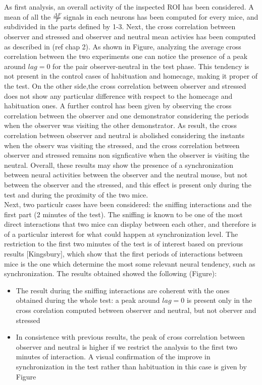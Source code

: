 \documentclass[a4paper]{article}
\begin{document}
As first analysis, an overall activity of the inspected ROI has been considered. A mean of all the $\frac{\Delta F}{F}$ signals in each neurons has been computed for every mice, and subdivided in the parts defined by 1-3. Next, the cross correlation between observer and stressed and observer and neutral mean activies has been computed as described in (ref chap 2). As shown in Figure, analyzing the average cross correlation between the two experiments one can notice the presence of a peak around $ lag=0 $ for the pair observer-neutral in the test phase. This tendency is not present in the control cases of habituation and homecage, making it proper of the test. On the other side,the cross correlation between observer and stressed does not show any particular difference with respect to the homecage and habituation ones. A further control has been given by observing the cross correlation between the observer and one demonstrator considering the periods when the observer was visiting the other demonstrator. As result, the cross correlation between observer and neutral is abolished considering the instants when the observ was visiting the stressed, and the cross correlation between observer and stressed remains non signficative when the observer is visiting the neutral. Overall, these results may show the presence of a synchronization between neural activities between the observer and the neutral mouse, but not between the observer and the stressed, and this effect is present only during the test and during the proximity of the two mice.\\
Next, two particulr cases have been considered: the sniffing interactions and the first part (2 minutes of the test). The sniffing is known to be one of the most direct interactions that two mice can display between each other, and therefore is of a particular interest for what could happen at synchronization level. The restriction to the first two minutes of the test is of interest based on previous results [Kingsbury], which show that the first periods of interactions between mice is the one which determine the most some relevant neural tendency, such as synchronization. The results obtained showed the following (Figure):

\begin{itemize}
	\item The result during the sniffing interactions are coherent with the ones obtained during the whole test: a peak around $lag=0$ is present only in the cross corelation computed between observer and neutral, but not oberver and stressed
	
	\item In consistence with previous results, the peak of cross correlation between observer and neutral is higher if we restrict the analysis to the first two minutes of interaction. A visual confirmation of the improve in synchronization in the test rather than habituation in this case is given by Figure
	
\end{itemize}
\end{document}
